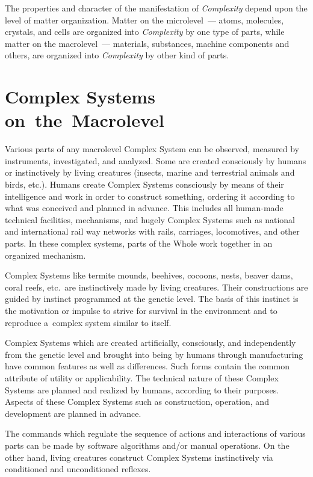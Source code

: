 \begin{multicols}{2}
The properties and character of the manifestation of \textit{Complexity} depend upon the level 
of matter organization. Matter on the microlevel~--- atoms, molecules, crystals, and cells are
organized into \textit{Complexity} by one type of parts, while matter on the macrolevel~---
materials, substances, machine components and others, are organized into \textit{Complexity} by 
other kind of parts. 

\vspace*{-9pt}

\section*{Complex Systems on~the~Macrolevel}

\noindent
Various parts of any macrolevel Complex System can be observed, measured by 
instruments, investigated, and analyzed. Some are created consciously by humans or instinctively 
by living creatures (insects, marine and terrestrial animals and birds, etc.). Humans create 
Complex Systems consciously by means of their intelligence and work in order to construct 
something, ordering it according to what was conceived and planned in advance. This includes 
all human-made technical facilities, mechanisms, and hugely Complex Systems such as national 
and international rail way networks with rails, carriages, locomotives, and other parts. In 
these complex systems, parts of the Whole work together in an organized mechanism.

Complex Systems like termite mounds, beehives, cocoons, nests, beaver dams, coral reefs, 
etc.\ are instinctively made by living creatures. Their constructions are guided by instinct 
programmed at the genetic level. The basis of this instinct is the motivation or impulse to strive 
for survival in the environment and to reproduce a~complex system similar to itself. 

Complex Systems which are created artificially, consciously, and independently from the genetic 
level and brought into being by humans through manufacturing have common features as well as 
differences. Such forms contain the common attribute of utility or applicability. The technical 
nature of these Complex Systems are planned and realized by humans, according to their 
purposes. Aspects of these Complex Systems such as construction, operation, and development 
are planned in advance. 

The commands which regulate the sequence of actions and interactions 
of various parts can be made by software algorithms and/or manual operations. On the other
hand,  living creatures construct Complex Systems instinctively via conditioned and unconditioned 
reflexes.


\end{multicols}

